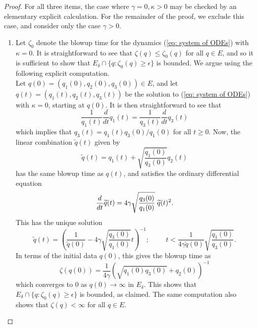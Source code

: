 \documentclass[11pt, notitlepage]{article}
\begin{document}
\begin{proof} For all three items, the case where $\gamma=0, \kappa>0$ may be checked by an elementary explicit calculation. For the remainder of the proof, we exclude this case, and consider only the case $\gamma>0.$ \begin{enumerate}[label=\roman{*}).]
    \item Let $\zeta_0$ denote the blowup time for the dynamics (\ref{eq: system of ODEs}) with $\kappa=0$. It is straightforward to see that $\zeta(q)\le\zeta_0(q)$ for all $q\in E$, and so it is sufficient to show that $E_\delta\cap \{q: \zeta_0(q)\ge \epsilon\}$ is bounded. We argue using the following explicit computation. \medskip \\ Let $q(0)=(q_1(0),q_2(0),q_3(0))\in E$, and let $q(t)=(q_1(t),q_2(t),q_3(t))$ be the solution to (\ref{eq: system of ODEs}) with $\kappa=0$, starting at $q(0)$. It is then straightforward to see that \begin{equation}
        \frac{1}{q_1(t)}\frac{d}{dt}q_1(t)=\frac{1}{q_3(t)}\frac{d}{dt}q_3(t)
    \end{equation} which implies that $q_3(t)=q_1(t)q_3(0)/q_1(0)$ for all $t\ge 0$. Now, the linear combination $\widetilde{q}(t)$ given by \begin{equation}
        \widetilde{q}(t)=q_1(t)+\sqrt{\frac{q_1(0)}{q_3(0)}}q_2(t)
    \end{equation} has the same blowup time as $q(t)$, and satisfies the ordinary differential equation \begin{equation} \frac{d}{dt}\widetilde{q}(t)=4\gamma\sqrt{\frac{q_3(0)}{q_1(0)}}\hspace{0.1cm}\widetilde{q}(t)^2. \end{equation} This has the unique solution \begin{equation} \widetilde{q}(t)=\left(\frac{1}{\widetilde{q}(0)}-4\gamma\sqrt{\frac{q_3(0)}{q_1(0)}}t\right)^{-1}; \hspace{1cm} t< \frac{1}{4\gamma\widetilde{q}(0)}\sqrt{\frac{q_1(0)}{q_3(0)}}. \end{equation} In terms of the initial data $q(0)$, this gives the blowup time as \begin{equation} \zeta(q(0))=\frac{1}{4\gamma}\left(\sqrt{q_1(0)q_3(0)}+q_2(0)\right)^{-1} \end{equation} which converges to $0$ as $q(0)\rightarrow \infty$ in $E_\delta.$ This shows that $E_\delta \cap \{q: \zeta_0(q)\ge \epsilon\}$ is bounded, as claimed. The same computation also shows that $\zeta(q)<\infty$ for all $q\in E$.

\end{enumerate}
\end{proof}
\end{document}
